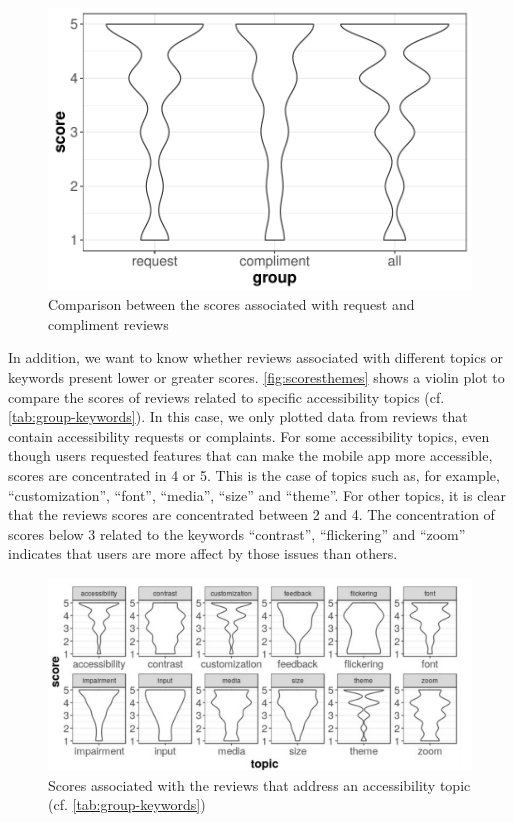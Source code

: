  \begin{figure}[!htb]
 \centering
\includegraphics[scale=0.8]{imagens/scores-compliment-request.pdf}
\caption{Comparison between the scores associated with request and compliment reviews}
\label{fig:reqcompscores}
\end{figure}

In addition, we want to know whether reviews associated with different topics or keywords present lower or greater scores. 
\autoref{fig:scoresthemes} shows a violin plot to compare the scores of reviews related to specific accessibility topics (cf. \autoref{tab:group-keywords}). In this case, we only plotted data from reviews that contain accessibility requests or complaints. For some accessibility topics, even though users requested features that can make the mobile app more accessible, scores are concentrated in 4 or 5. This is the case of topics such as, for example, ``customization'', ``font'', ``media'', ``size'' and ``theme''. For other topics, it is clear that the reviews scores are concentrated between 2 and 4. The concentration of scores below 3 related to the keywords ``contrast'', ``flickering'' and ``zoom'' indicates that users are more affect by those issues than others.

 \begin{figure}[!htb]
 \centering
\includegraphics[scale=0.57]{imagens/score-themes-adapt.pdf}
\caption{Scores associated with the reviews that address an accessibility topic (cf. \autoref{tab:group-keywords})}
\label{fig:scoresthemes}
\end{figure}

